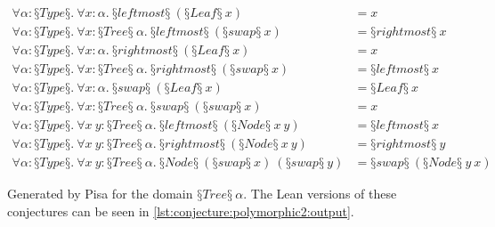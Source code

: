 \vspace{-1.1cm}
\begin{conjectureset}[H]
\begin{align}
\forall \alpha : §Type§.\ \forall x : \alpha.\ §leftmost§\ (§Leaf§\ x) &= x \label{leftmostfixpoint}\\
\forall \alpha : §Type§.\ \forall x : §Tree§\ \alpha.\ §leftmost§\ (§swap§\ x) &= §rightmost§\ x \label{defeq1}\\
\forall \alpha : §Type§.\ \forall x : \alpha.\ §rightmost§\ (§Leaf§\ x) &= x \label{rightmostfixpoint}\\
\forall \alpha : §Type§.\ \forall x : §Tree§\ \alpha.\ §rightmost§\ (§swap§\ x) &= §leftmost§\ x \label{defeq2}\\
\forall \alpha : §Type§.\ \forall x : \alpha.\ §swap§\ (§Leaf§\ x) &= §Leaf§\ x \label{swapfixpoint}\\
\forall \alpha : §Type§.\ \forall x : §Tree§\ \alpha.\ §swap§\ (§swap§\ x) &= x \label{swapinverse}\\
\forall \alpha : §Type§.\ \forall x\ y : §Tree§\ \alpha.\ §leftmost§\ (§Node§\ x\ y) &= §leftmost§\ x\\
\forall \alpha : §Type§.\ \forall x\ y : §Tree§\ \alpha.\ §rightmost§\ (§Node§\ x\ y) &= §rightmost§\ y\\
\forall \alpha : §Type§.\ \forall x\ y : §Tree§\ \alpha.\ §Node§\ (§swap§\ x)\ (§swap§\ y) &= §swap§\ (§Node§\ y\ x)
\end{align}
\vspace{-0.9cm}
\caption[Generated by Pisa for the domain $§Tree§\ \alpha$.]{
  Generated by Pisa for the domain $§Tree§\ \alpha$.
  The Lean versions of these conjectures can be seen in \cref{lst:conjecture:polymorphic2:output}.
}\label{eqs:tree}
\end{conjectureset}

